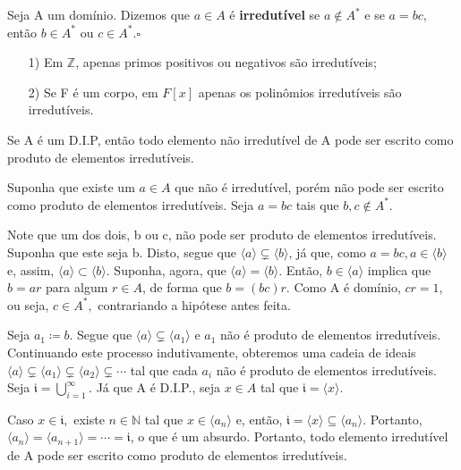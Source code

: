 \documentclass[algebraII_notes.tex]{subfiles}
\begin{document}
\begin{def*}
	Seja A um domínio. Dizemos que \(a\in A\) é \textbf{irredutível} se \(a\not\in A^{*}\) e se \(a = bc,\) então \(b\in A^{*}\) ou \(c\in A^{*}.\square\)
\end{def*}
\begin{example}
	\begin{itemize}
		\item[1)] Em \(\mathbb{Z}\), apenas primos positivos ou negativos são irredutíveis;
		\item[2)] Se F é um corpo, em \(F[x]\) apenas os polinômios irredutíveis são irredutíveis.
	\end{itemize}
\end{example}
\begin{theorem*}
	Se A é um D.I.P, então todo elemento não irredutível de A pode ser escrito como produto de elementos irredutíveis.
\end{theorem*}
\begin{proof*}
	Suponha que existe um \(a\in A\) que não é irredutível, porém não pode ser escrito como produto de
	elementos irredutíveis. Seja \(a=bc\) tais que \(b, c\not\in A^{*}.\)

	Note que um dos dois, b ou c, não pode ser produto de elementos irredutíveis. Suponha que este seja b.
	Disto, segue que \(\langle a \rangle\subsetneq{\langle b \rangle}\), já que, como \(a=bc, a\in \langle b \rangle\) e, assim,
	\(\langle a \rangle\subset{\langle b \rangle}\). Suponha, agora, que \(\langle a \rangle = \langle b \rangle.\) Então, \(b\in \langle a \rangle\) implica
	que \(b = ar\) para algum \(r\in A\), de forma que \(b = (bc)r.\) Como A é domínio, \(cr = 1\), ou seja, \(c\in A^{*},\)
	contrariando a hipótese antes feita.

	Seja \(a_{1}\coloneqq b.\) Segue que \(\langle a \rangle\subsetneq{\langle a_{1} \rangle}\) e \(a_{1}\) não é produto de elementos irredutíveis.
	Continuando este processo indutivamente, obteremos uma cadeia de ideais \(\langle a \rangle \subsetneq{\langle a_{1} \rangle}\subsetneq{\langle a_{2} \rangle}\subsetneq{\cdots}\)
	tal que cada \(a_{i}\) não é produto de elementos irredutíveis. Seja \(\mathfrak{i} = \bigcup_{i=1}^{\infty}{}\). Já que A é D.I.P., seja \(x\in A\) tal que \(\mathfrak{i} = \langle x \rangle\).

	Caso \(x\in \mathfrak{i},\) existe \(n\in \mathbb{N}\) tal que \(x\in \langle a_{n} \rangle\) e, então, \(\mathfrak{i} = \langle x \rangle\subseteq{\langle a_{n} \rangle}.\) Portanto,
	\(\langle a_{n} \rangle = \langle a_{n+1} \rangle = \cdots = \mathfrak{i}\), o que é um absurdo. Portanto, todo elemento irredutível de A
	pode ser escrito como produto de elementos irredutíveis. \qedsymbol
\end{proof*}
\end{document}
